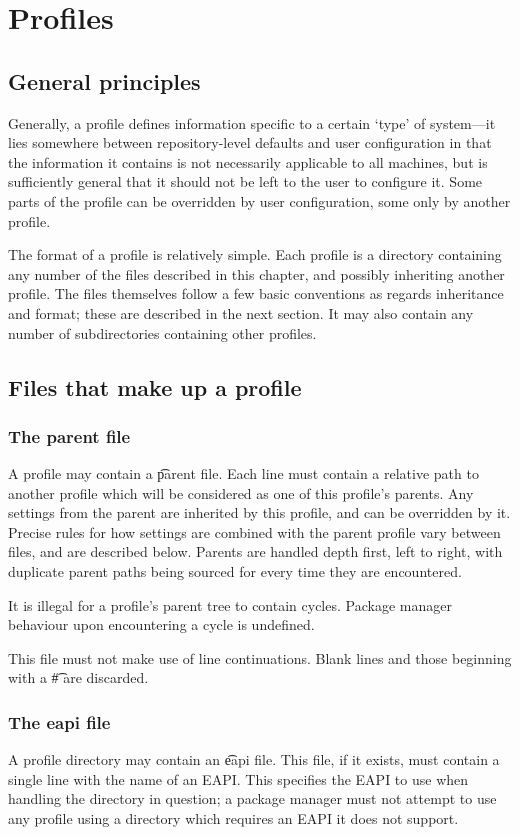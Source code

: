 \chapter{Profiles}
\label{ch:profiles}

\section{General principles}
Generally, a profile defines information specific to a certain `type' of system---it lies somewhere
between repository-level defaults and user configuration in that the information it contains is not
necessarily applicable to all machines, but is sufficiently general that it should not be left to
the user to configure it. Some parts of the profile can be overridden by user configuration, some
only by another profile.

The format of a profile is relatively simple. Each profile is a directory containing any number of
the files described in this chapter, and possibly inheriting another profile. The files themselves
follow a few basic conventions as regards inheritance and format; these are described in the next
section. It may also contain any number of subdirectories containing other profiles.

\section{Files that make up a profile}

\subsection{The parent file}
A profile may contain a \t{parent} file. Each line must contain a relative path to another profile
which will be considered as one of this profile's parents. Any settings from the parent are
inherited by this profile, and can be overridden by it. Precise rules for how settings are combined
with the parent profile vary between files, and are described below. Parents are handled depth
first, left to right, with duplicate parent paths being sourced for every time they are encountered.

It is illegal for a profile's parent tree to contain cycles. Package manager behaviour upon
encountering a cycle is undefined.

This file must not make use of line continuations. Blank lines and those beginning with a \t{\#}
are discarded.

\subsection{The eapi file}
\label{sec:profile-eapi}
A profile directory may contain an \t{eapi} file. This file, if it exists, must contain a single
line with the name of an EAPI\@. This specifies the EAPI to use when handling the directory in
question; a package manager must not attempt to use any profile using a directory which requires an
EAPI it does not support.


